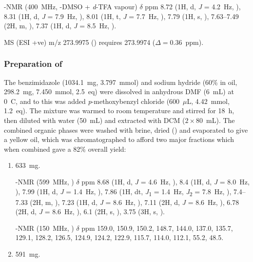 \begin{refsection}
-NMR (400~MHz, -DMSO + \textit{d}-TFA vapour) $\delta$ ppm 8.72 (1H, d, \textit{J} = 4.2~Hz, ), 8.31 (1H, d, \textit{J} = 7.9~Hz, ), 8.01 (1H, t, \textit{J} = 7.7~Hz, ), 7.79 (1H, s, ), 7.63--7.49 (2H, m, ), 7.37 (1H, d, \textit{J} = 8.5~Hz, ). 

MS (ESI +ve) m/z 273.9975 ()  requires 273.9974 ($\Delta=0.36$~ppm).

\subsubsection{Preparation of }
The benzimidazole  (1034.1~mg, 3.797~mmol) and sodium hydride (60\% in oil, 298.2~mg, 7.450~mmol, 2.5~eq) were dissolved in anhydrous DMF (6~mL) at 0~\degree{}C, and to this was added \textit{p}-methoxybenzyl chloride (600~$\mu$L, 4.42~mmol, 1.2~eq).
The mixture was warmed to room temperature and stirred for 18~h, then diluted with water (50~mL) and extracted with DCM ($2\times80$~mL).
The combined organic phases were washed with brine, dried () and evaporated to give a yellow oil, which was chromatographed to afford two major fractions which when combined gave a 82\% overall yield:
\begin{enumerate}
    \item 633~mg.
    
    -NMR (599~MHz, ) $\delta$ ppm 
    8.68 (1H, d, \textit{J} = 4.6~Hz, ), 
    8.4 (1H, d, \textit{J} = 8.0~Hz, ), 
    7.99 (1H, d, \textit{J} = 1.4~Hz, ), 
    7.86 (1H, dt, \textit{J}\textsubscript{1} = 1.4~Hz, \textit{J}\textsubscript{2} = 7.8~Hz, ), 
    7.4--7.33 (2H, m, ), 
    7.23 (1H, d, \textit{J} = 8.6~Hz, ), 
    7.11 (2H, d, \textit{J} = 8.6~Hz, ), 
    6.78 (2H, d, \textit{J} = 8.6~Hz, ), 
    6.1 (2H, s, ), 
    3.75 (3H, s, ).

    -NMR (150~MHz, ) $\delta$ ppm 159.0, 150.9, 150.2, 148.7, 144.0, 137.0, 135.7, 129.1, 128.2, 126.5, 124.9, 124.2, 122.9, 115.7, 114.0, 112.1, 55.2, 48.5.

    \item 591~mg.
    

\end{enumerate}
\end{refsection}
